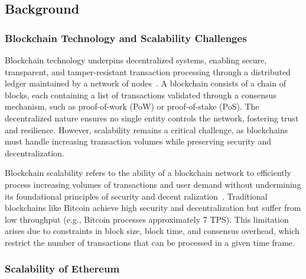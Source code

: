 \vspace{12pt}

\subsection{Background}

\vspace{12pt}

\subsubsection{Blockchain Technology and Scalability Challenges}

\vspace{12pt}

Blockchain technology underpins decentralized systems, enabling secure, transparent, and tamper-resistant transaction processing through a distributed ledger maintained by a network of nodes~\cite{nakamoto2008bitcoin}. A blockchain consists of a chain of blocks, each containing a list of transactions validated through a consensus mechanism, such as proof-of-work (PoW) or proof-of-stake (PoS). The decentralized nature ensures no single entity controls the network, fostering trust and resilience. However, scalability remains a critical challenge, as blockchains must handle increasing transaction volumes while preserving security and decentralization.

\vspace{12pt}

Blockchain scalability refers to the ability of a blockchain network to efficiently process increasing volumes of transactions and user demand without undermining its foundational principles of security and decent
ralization~\cite{buterin2014ethereum,khan2021challenges}. Traditional blockchains like Bitcoin achieve high security and decentralization but suffer from low throughput (e.g., Bitcoin processes approximately 7 TPS). This limitation arises due to constraints in block size, block time, and consensus overhead, which restrict the number of transactions that can be processed in a given time frame.

\vspace{12pt}

\subsubsection{Scalability of Ethereum}

\vspace{12pt}

